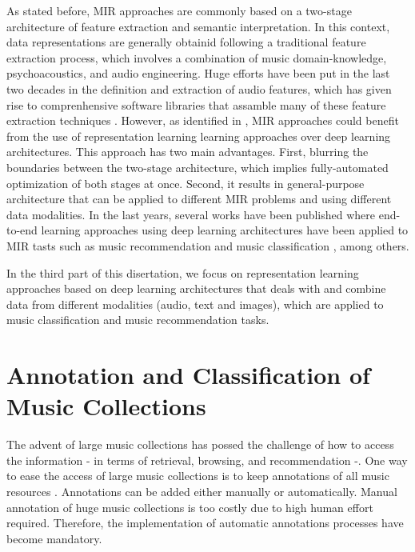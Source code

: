 As stated before, MIR approaches are commonly based on a two-stage architecture of feature extraction and semantic interpretation. In this context, data representations are generally obtainid following a traditional feature extraction process, which involves a combination of music domain-knowledge, psychoacoustics, and audio engineering. Huge efforts have been put in the last two decades in the definition and extraction of audio features, which has given rise to comprenhensive software libraries that assamble many of these feature extraction techniques \cite{Essentia, Librosa}. However, as identified in \cite{humphrey2012}, MIR approaches could benefit from the use of representation learning learning approaches over deep learning architectures. This approach has two main advantages. First, blurring the boundaries between the two-stage architecture, which implies fully-automated optimization of both stages at once. Second, it results in general-purpose architecture that can be applied to different MIR problems and using different data modalities. In the last years, several works have been published where end-to-end learning approaches using deep learning architectures have been applied to MIR tasts such as music recommendation \cite{Oord2013} and music classification \cite{Choi2016}, among others.

In the third part of this disertation, we focus on representation learning approaches based on deep learning architectures that deals with and combine data from different modalities (audio, text and images), which are applied to music classification and music recommendation tasks.

\section{Annotation and Classification of Music Collections}

The advent of large music collections has possed the challenge of how to access the information - in terms of retrieval, browsing, and recommendation -. One way to ease the access of large music collections is to keep annotations of all music resources \cite{sordo2012semantic}. Annotations can be added either manually or automatically. Manual annotation of huge music collections is too costly due to high human effort required. Therefore, the implementation of automatic annotations processes have become mandatory. 

